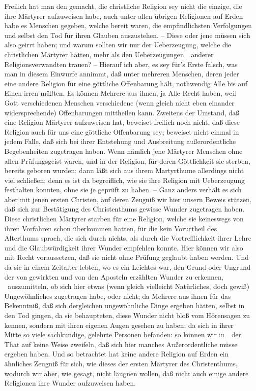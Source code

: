 \begin{aufza}
\item Freilich hat man den  gemacht, die christliche Religion sey nicht die einzige, die ihre Märtyrer aufzuweisen habe, auch unter allen übrigen Religionen auf Erden habe es Menschen gegeben, welche bereit waren, die empfindlichsten Verfolgungen und selbst den Tod für ihren Glauben auszustehen. -- Diese oder jene müssen sich also geirrt haben; und warum sollten wir nur der Ueberzeugung, welche die christlichen Märtyrer hatten, mehr als den Ueberzeugungen~\ anderer Religionsverwandten trauen? -- Hierauf  ich aber, es sey für's Erste falsch, was man in diesem Einwurfe annimmt, daß unter mehreren Menschen, deren jeder eine andere Religion für eine göttliche Offenbarung hält, nothwendig Alle bis auf Einen irren müßten. Es können Mehrere aus ihnen, ja Alle Recht haben, weil Gott verschiedenen Menschen verschiedene (wenn gleich nicht eben einander widersprechende) Offenbarungen mittheilen kann. Zweitens der Umstand, daß eine Religion Märtyrer aufzuweisen hat, beweiset freilich noch nicht, daß diese Religion auch für uns eine göttliche Offenbarung sey; beweiset nicht einmal in jedem Falle, daß sich bei ihrer Entstehung und Ausbreitung außerordentliche Begebenheiten zugetragen haben. Wenn nämlich jene Märtyrer Menschen ohne allen Prüfungsgeist waren, und in der Religion, für deren Göttlichkeit sie sterben, bereits geboren wurden; dann läßt sich aus ihrem Martyrthume allerdings nicht viel schließen; denn es ist da begreiflich, wie sie ihre Religion mit Ueberzeugung festhalten konnten, ohne sie je geprüft zu haben. -- Ganz anders verhält es sich aber mit jenen ersten Christen, auf deren Zeugniß wir hier unsern Beweis stützen, daß sich zur Bestätigung des Christenthums gewisse Wunder zugetragen haben. Diese christlichen Märtyrer starben für eine Religion, welche sie keineswegs von ihren Vorfahren schon überkommen hatten, für die kein Vorurtheil des Alterthums sprach, die sich durch nichts, als durch die Vortrefflichkeit ihrer Lehre und die Glaubwürdigkeit ihrer Wunder empfehlen konnte. Hier können wir also mit Recht voraussetzen, daß sie nicht ohne Prüfung geglaubt haben werden. Und da sie in einem Zeitalter lebten, wo es ein Leichtes war, den Grund oder Ungrund der von  gewirkten und von den Aposteln erzählten Wunder zu erkennen, \dh\ auszumitteln, ob sich hier etwas (wenn gleich vielleicht Natürliches, doch gewiß) Ungewöhnliches zugetragen habe, oder nicht; da Mehrere aus ihnen für das Bekenntniß, daß sich dergleichen ungewöhnliche Dinge ergeben hätten, selbst in den Tod gingen, da sie behaupteten, diese Wunder nicht bloß vom Hörensagen zu kennen, sondern mit ihren eigenen Augen gesehen zu haben; da sich in ihrer Mitte so viele sachkundige, gelehrte Personen befanden: so können wir in~\ der That auf keine Weise zweifeln, daß sich hier manches Außerordentliche müsse ergeben haben. Und so betrachtet hat keine andere Religion auf Erden ein ähnliches Zeugniß für sich, wie dieses der ersten Märtyrer des Christenthums, wodurch wir aber, wie gesagt, nicht läugnen wollen, daß nicht auch einige andere Religionen ihre Wunder aufzuweisen haben.
\end{aufza}

